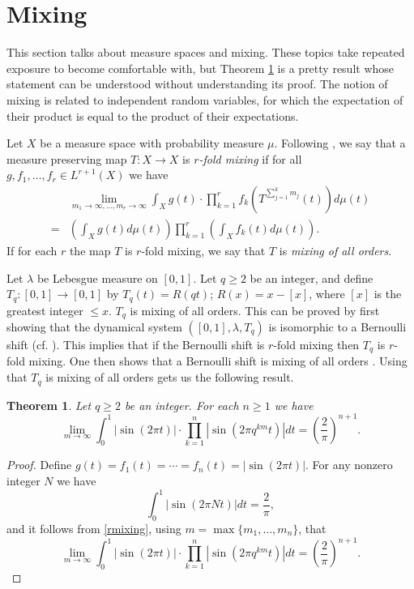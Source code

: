 \documentclass{amsart}
\newtheorem{theorem}{Theorem}
\begin{document}
\section{Mixing}
This section talks about measure spaces and mixing. These topics take repeated exposure to become comfortable with,
but Theorem \ref{allorders} is a pretty result whose statement can be understood without understanding its proof.
The notion of mixing is related to independent random variables,
for which the expectation of their product is equal to the product of their expectations.

Let $X$ be a measure space with probability measure $\mu$. Following  \cite[p.~21, Definition 3.6]{EMS}, we say that a measure preserving map $T:X \to X$ is {\em $r$-fold mixing}
if for all $g,f_1,\ldots,f_r \in L^{r+1}(X)$ we have 
\begin{equation}
\begin{split}
&\lim_{m_1 \to \infty,\ldots,m_r \to \infty} \int_X g(t) \cdot \prod_{k=1}^r f_k\left(T^{\sum_{j=1}^k m_j}(t)\right)
d\mu(t)\\
=&\left(\int_X g(t) d\mu(t)\right) \prod_{k=1}^r \left( \int_X f_k(t) d\mu(t) \right).
\end{split}
\label{rmixing}
\end{equation}
If for each $r$ the map $T$ is $r$-fold mixing, we say that $T$ is {\em mixing of all orders}.


Let $\lambda$ be Lebesgue measure on $[0,1]$. Let $q \geq 2$ be an integer, and define $T_q:[0,1] \to [0,1]$ by 
$T_q(t)=R(qt)$; $R(x)=x-[x]$, where $[x]$ is the greatest integer $\leq x$. $T_q$ is mixing of all orders. This can be proved by first showing that
the dynamical system $([0,1],\lambda,T_q)$ is  isomorphic to a Bernoulli shift (cf. \cite[p.~17, Example 2.8]{einsiedler}). This implies that if the Bernoulli shift is $r$-fold mixing then
$T_q$ is $r$-fold mixing. One then shows that a Bernoulli shift is mixing of all orders
\cite[p.~53, Exercise 2.7.9]{einsiedler}. Using that $T_q$ is mixing of all orders gets us the following result.


\begin{theorem}
Let $q \geq 2$ be an integer. For each $n \geq 1$ we have
\[
\lim_{m \to \infty} \int_0^1 |\sin(2\pi t)| \cdot \prod_{k=1}^n \left| \sin\left(2\pi q^{km} t\right) \right|  dt
= \left( \frac{2}{\pi} \right)^{n+1}.
\]
\label{allorders}
\end{theorem}
\begin{proof}
Define
$g(t)=f_1(t)=\cdots=f_n(t)=|\sin(2\pi t)|$. For any nonzero integer $N$ we have
\[
\int_0^1 |\sin(2\pi N t)| dt=\frac{2}{\pi},
\]
and it follows from \eqref{rmixing}, using $m=\max\{m_1,\ldots,m_n\}$, that
\[
\lim_{m \to \infty} \int_0^1 |\sin(2\pi t)| \cdot \prod_{k=1}^n \left| \sin\left(2\pi q^{km} t\right) \right|  dt
= \left( \frac{2}{\pi} \right)^{n+1}.
\]
\end{proof}
\end{document}

